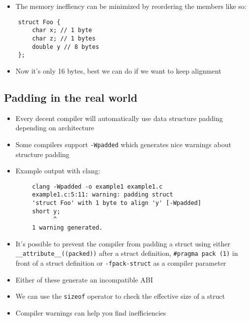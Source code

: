 \documentclass{beamer}
\begin{document}
\begin{frame}[fragile]{\insertsection}{\insertsubsection}
    \begin{itemize}
        \item The memory ineffiency can be minimized by reordering the members like so:
    \end{itemize}
    \begin{verbatim}
    struct Foo {
        char x; // 1 byte
        char z; // 1 bytes
        double y // 8 bytes
    };
    \end{verbatim}
    \begin{itemize}
        \item Now it's only 16 bytes, best we can do if we want to keep alignment
    \end{itemize}
\end{frame}

\subsection{Padding in the real world}
\begin{frame}[fragile]{\insertsection}{\insertsubsection}
    \begin{itemize}
        \item Every decent compiler will automatically use data structure padding depending
            on architecture
        \item Some compilers support \verb|-Wpadded| which generates nice warnings about structure
            padding
        \item Example output with clang:
    \end{itemize}
    \begin{verbatim}
        clang -Wpadded -o example1 example1.c
        example1.c:5:11: warning: padding struct 
        'struct Foo' with 1 byte to align 'y' [-Wpadded]
        short y;
              ^
        1 warning generated.
    \end{verbatim}
\end{frame}

\begin{frame}[fragile]{\insertsection}{\insertsubsection}
    \begin{itemize}
        \item It's possible to prevent the compiler from padding a struct using either
            \verb|__attribute__((packed))| after a struct definition, \verb|#pragma pack (1)| in
            front of a struct definition or \verb|-fpack-struct| as a compiler parameter
        \item Either of these generate an incompatible ABI
        \item We can use the \verb|sizeof| operator to check the effective size of a struct
        \item Compiler warnings can help you find inefficiencies
    \end{itemize}
\end{frame}
\end{document}
